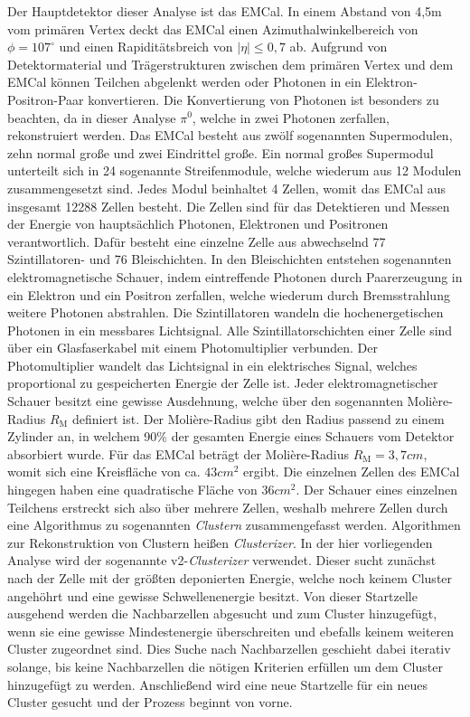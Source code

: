 Der Hauptdetektor dieser Analyse ist das EMCal.
In einem Abstand von 4,5m vom prim\"aren Vertex deckt das EMCal einen Azimuthalwinkelbereich von $\phi=107^{\circ}$ und einen Rapidit\"atsbreich von $ |\eta| \leq 0,7$ ab.
Aufgrund von Detektormaterial und Tr\"agerstrukturen zwischen dem prim\"aren Vertex und dem EMCal k\"onnen Teilchen abgelenkt werden oder Photonen in ein Elektron-Positron-Paar konvertieren.
Die Konvertierung von Photonen ist besonders zu beachten, da in dieser Analyse $\pi^{0}$, welche in zwei Photonen zerfallen, rekonstruiert werden.
\newline
Das EMCal besteht aus zw\"olf sogenannten Supermodulen, zehn normal gro{\ss}e und zwei Eindrittel gro{\ss}e.
Ein normal gro{\ss}es Supermodul unterteilt sich in 24 sogenannte Streifenmodule, welche wiederum aus 12 Modulen zusammengesetzt sind.
Jedes Modul beinhaltet 4 Zellen, womit das EMCal aus insgesamt 12288 Zellen besteht.
Die Zellen sind f\"ur das Detektieren und Messen der Energie von haupts\"achlich Photonen, Elektronen und Positronen verantwortlich.
Daf\"ur besteht eine einzelne Zelle aus abwechselnd 77 Szintillatoren- und 76 Bleischichten.
In den Bleischichten entstehen sogenannten elektromagnetische Schauer, indem eintreffende Photonen durch Paarerzeugung in ein Elektron und ein Positron zerfallen, welche wiederum durch Bremsstrahlung weitere Photonen abstrahlen.
Die Szintillatoren wandeln die hochenergetischen Photonen in ein messbares Lichtsignal.
Alle Szintillatorschichten einer Zelle sind \"uber ein Glasfaserkabel mit einem Photomultiplier verbunden.
Der Photomultiplier wandelt das Lichtsignal in ein elektrisches Signal, welches proportional zu gespeicherten Energie der Zelle ist.
\newline
Jeder elektromagnetischer Schauer besitzt eine gewisse Ausdehnung, welche \"uber den sogenannten Moli\`ere-Radius $R_{\text{M}}$ definiert ist.
Der Moli\`ere-Radius gibt den Radius passend zu einem Zylinder an, in welchem 90\% der gesamten Energie eines Schauers vom Detektor absorbiert wurde.
F\"ur das EMCal betr\"agt der Moli\`ere-Radius $R_{\text{M}} = 3,7 cm$, womit sich eine Kreisfl\"ache von ca. $43 cm^{2}$ ergibt.
Die einzelnen Zellen des EMCal hingegen haben eine quadratische Fl\"ache von $36 cm^{2}$. 
Der Schauer eines einzelnen Teilchens erstreckt sich also \"uber mehrere Zellen, weshalb mehrere Zellen durch eine Algorithmus zu sogenannten \textit{Clustern} zusammengefasst werden.
Algorithmen zur Rekonstruktion von Clustern hei{\ss}en \textit{Clusterizer}.
In der hier vorliegenden Analyse wird der sogenannte v2-\textit{Clusterizer} verwendet.
Dieser sucht zun\"achst nach der Zelle mit der gr\"o{\ss}ten deponierten Energie, welche noch keinem Cluster angeh\"ohrt und eine gewisse Schwellenenergie besitzt.
Von dieser Startzelle ausgehend werden die Nachbarzellen abgesucht und zum Cluster hinzugef\"ugt, wenn sie eine gewisse Mindestenergie \"uberschreiten und ebefalls keinem weiteren Cluster zugeordnet sind.
Dies Suche nach Nachbarzellen geschieht dabei iterativ solange, bis keine Nachbarzellen die n\"otigen Kriterien erf\"ullen um dem Cluster hinzugef\"ugt zu werden.
Anschlie{\ss}end wird eine neue Startzelle f\"ur ein neues Cluster gesucht und der Prozess beginnt von vorne.

